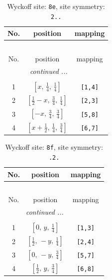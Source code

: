 \documentclass[fleqn,8pt]{jsarticle}
\begin{document}
\renewcommand{\arraystretch}{1.2}
\begin{longtable}{ccc}
\caption{Wyckoff site: {\tt 8e}, site symmetry: {\tt 2..}}
 \\
 \hline \hline
No. & position & mapping \\ \hline \endfirsthead

\multicolumn{2}{l}{\tablename\ \thetable{}} \\
 \hline \hline
No. & position & mapping \\ \hline \endhead

 \hline \hline
\multicolumn{2}{r}{\footnotesize\it continued ...} \\ \endfoot

 \hline \hline
\multicolumn{2}{r}{} \\ \endlastfoot

1 & $\left[ x,\, \frac{1}{4},\, \frac{1}{4} \right]$ & {\tt [1,4]} \\ \hline
2 & $\left[ \frac{1}{2} - x,\, \frac{3}{4},\, \frac{1}{4} \right]$ & {\tt [2,3]} \\ \hline
3 & $\left[ - x,\, \frac{3}{4},\, \frac{3}{4} \right]$ & {\tt [5,8]} \\ \hline
4 & $\left[ x + \frac{1}{2},\, \frac{1}{4},\, \frac{3}{4} \right]$ & {\tt [6,7]} \\
\end{longtable}
\renewcommand{\arraystretch}{1.2}
\begin{longtable}{ccc}
\caption{Wyckoff site: {\tt 8f}, site symmetry: {\tt .2.}}
 \\
 \hline \hline
No. & position & mapping \\ \hline \endfirsthead

\multicolumn{2}{l}{\tablename\ \thetable{}} \\
 \hline \hline
No. & position & mapping \\ \hline \endhead

 \hline \hline
\multicolumn{2}{r}{\footnotesize\it continued ...} \\ \endfoot

 \hline \hline
\multicolumn{2}{r}{} \\ \endlastfoot

1 & $\left[ 0,\, y,\, \frac{1}{4} \right]$ & {\tt [1,3]} \\ \hline
2 & $\left[ \frac{1}{2},\, - y,\, \frac{1}{4} \right]$ & {\tt [2,4]} \\ \hline
3 & $\left[ 0,\, - y,\, \frac{3}{4} \right]$ & {\tt [5,7]} \\ \hline
4 & $\left[ \frac{1}{2},\, y,\, \frac{3}{4} \right]$ & {\tt [6,8]} \\
\end{longtable}
\end{document}
